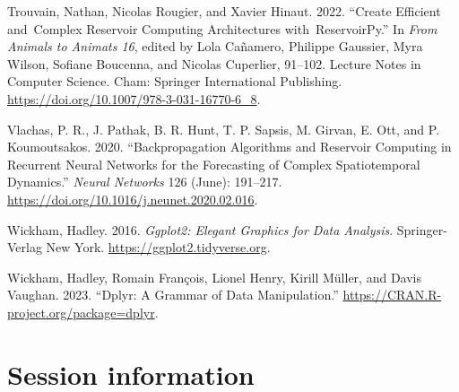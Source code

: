 \documentclass[
  11pt,
  a4paper,
]{article}
\newlength{\cslhangindent}
\newenvironment{CSLReferences}[2] %
 {\begin{list}{}{%
  \setlength{\itemindent}{0pt}
  \setlength{\leftmargin}{0pt}
  \setlength{\parsep}{0pt}
  \ifodd #1
   \setlength{\leftmargin}{\cslhangindent}
   \setlength{\itemindent}{-1\cslhangindent}
  \fi
  \setlength{\itemsep}{#2\baselineskip}}}
 {\end{list}}
\theoremstyle{plain}
\theoremstyle{remark}
\begin{document}
\begin{CSLReferences}{1}{0}
Trouvain, Nathan, Nicolas Rougier, and Xavier Hinaut. 2022. {``Create
{Efficient} and~{Complex} {Reservoir} {Computing} {Architectures}
with~{ReservoirPy}.''} In \emph{From {Animals} to {Animats} 16}, edited
by Lola Cañamero, Philippe Gaussier, Myra Wilson, Sofiane Boucenna, and
Nicolas Cuperlier, 91--102. Lecture {Notes} in {Computer} {Science}.
Cham: Springer International Publishing.
\url{https://doi.org/10.1007/978-3-031-16770-6_8}.

Vlachas, P. R., J. Pathak, B. R. Hunt, T. P. Sapsis, M. Girvan, E. Ott,
and P. Koumoutsakos. 2020. {``Backpropagation Algorithms and {Reservoir}
{Computing} in {Recurrent} {Neural} {Networks} for the Forecasting of
Complex Spatiotemporal Dynamics.''} \emph{Neural Networks} 126 (June):
191--217. \url{https://doi.org/10.1016/j.neunet.2020.02.016}.

Wickham, Hadley. 2016. \emph{Ggplot2: {Elegant} {Graphics} for {Data}
{Analysis}}. Springer-Verlag New York.
\url{https://ggplot2.tidyverse.org}.

Wickham, Hadley, Romain François, Lionel Henry, Kirill Müller, and Davis
Vaughan. 2023. {``Dplyr: {A} {Grammar} of {Data} {Manipulation}.''}
\url{https://CRAN.R-project.org/package=dplyr}.

\end{CSLReferences}

\section*{Session information}\label{session-information}
\end{document}

